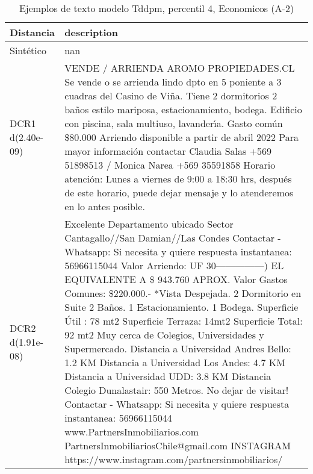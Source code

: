 \begin{table}[H]
\centering
\fontsize{10}{14}\selectfont
\caption{Ejemplos de texto modelo Tddpm, percentil 4, Economicos (A-2)}
\label{table-example-economicos-a-2-tddpm_mlp-4p-text}
\begin{tabular}{|l|m{35em}|}
\hline
\rowcolor[gray]{0.8}
Distancia & description \\
\hline Sintético & nan \\
\hline DCR1 d(2.40e-09) & VENDE / ARRIENDA AROMO PROPIEDADES.CL Se vende o se arrienda lindo dpto en 5 poniente a 3 cuadras del Casino de Vi\~na. Tiene 2 dormitorios 2 ba\~nos estilo mariposa, estacionamiento, bodega. Edificio con piscina, sala multiuso, lavander{\'\i}a. Gasto com\'un \$80.000 Arriendo disponible a partir de abril 2022  Para mayor informaci\'on contactar Claudia Salas +569 51898513 / Monica Narea +569 35591858  Horario atenci\'on: Lunes a viernes de 9:00 a 18:30 hrs, despu\'es de este horario, puede dejar mensaje y lo atenderemos en lo antes posible. \\
\hline DCR2 d(1.91e-08) & Excelente Departamento ubicado Sector Cantagallo//San Damian//Las Condes  Contactar - Whatsapp: Si necesita y quiere respuesta instantanea: 56966115044  Valor Arriendo: UF 30---------------) EL EQUIVALENTE A \$ 943.760 APROX. Valor Gastos Comunes: \$220.000.-  *Vista Despejada.  2 Dormitorio en Suite 2 Ba\~nos. 1 Estacionamiento. 1 Bodega.  Superficie \'Util : 78 mt2 Superficie Terraza: 14mt2 Superficie Total: 92 mt2  Muy cerca de Colegios, Universidades y Supermercado.  Distancia a Universidad Andres Bello: 1.2 KM  Distancia a Universidad Los Andes: 4.7 KM  Distancia a Universidad UDD: 3.8 KM  Distancia Colegio Dunalastair: 550 Metros.  No dejar de visitar!  Contactar - Whatsapp: Si necesita y quiere respuesta instantanea: 56966115044  www.PartnersInmobiliarios.com PartnersInmobiliariosChile@gmail.com  INSTAGRAM https://www.instagram.com/partnersinmobiliarios/ \\
\hline
\end{tabular}
\end{table}
